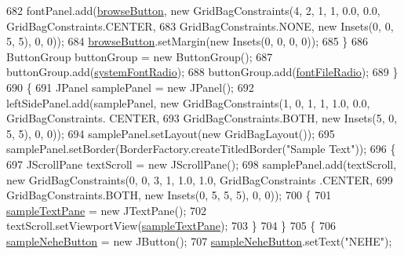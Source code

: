 \begin{DoxyCode}
682                 fontPanel.add(\mbox{\hyperlink{classorg_1_1newdawn_1_1slick_1_1tools_1_1hiero_1_1_hiero_a2a832e3532956e0f2a7fa390f9b8bc27}{browseButton}}, \textcolor{keyword}{new} GridBagConstraints(4, 2, 1, 1, 0.0, 0.0, 
      GridBagConstraints.CENTER,
683                     GridBagConstraints.NONE, \textcolor{keyword}{new} Insets(0, 0, 5, 5), 0, 0));
684                 \mbox{\hyperlink{classorg_1_1newdawn_1_1slick_1_1tools_1_1hiero_1_1_hiero_a2a832e3532956e0f2a7fa390f9b8bc27}{browseButton}}.setMargin(\textcolor{keyword}{new} Insets(0, 0, 0, 0));
685             \}
686             ButtonGroup buttonGroup = \textcolor{keyword}{new} ButtonGroup();
687             buttonGroup.add(\mbox{\hyperlink{classorg_1_1newdawn_1_1slick_1_1tools_1_1hiero_1_1_hiero_a59931ca39c1c08a384804e587259075f}{systemFontRadio}});
688             buttonGroup.add(\mbox{\hyperlink{classorg_1_1newdawn_1_1slick_1_1tools_1_1hiero_1_1_hiero_a2adc5b7c8bcbf375142240e2ab009adf}{fontFileRadio}});
689         \}
690         \{
691             JPanel samplePanel = \textcolor{keyword}{new} JPanel();
692             leftSidePanel.add(samplePanel, \textcolor{keyword}{new} GridBagConstraints(1, 0, 1, 1, 1.0, 0.0, GridBagConstraints.
      CENTER,
693                 GridBagConstraints.BOTH, \textcolor{keyword}{new} Insets(5, 0, 5, 5), 0, 0));
694             samplePanel.setLayout(\textcolor{keyword}{new} GridBagLayout());
695             samplePanel.setBorder(BorderFactory.createTitledBorder(\textcolor{stringliteral}{"Sample Text"}));
696             \{
697                 JScrollPane textScroll = \textcolor{keyword}{new} JScrollPane();
698                 samplePanel.add(textScroll, \textcolor{keyword}{new} GridBagConstraints(0, 0, 3, 1, 1.0, 1.0, GridBagConstraints
      .CENTER,
699                     GridBagConstraints.BOTH, \textcolor{keyword}{new} Insets(0, 5, 5, 5), 0, 0));
700                 \{
701                     \mbox{\hyperlink{classorg_1_1newdawn_1_1slick_1_1tools_1_1hiero_1_1_hiero_ae923b0a4ac6a5cbf8354555cb6091d26}{sampleTextPane}} = \textcolor{keyword}{new} JTextPane();
702                     textScroll.setViewportView(\mbox{\hyperlink{classorg_1_1newdawn_1_1slick_1_1tools_1_1hiero_1_1_hiero_ae923b0a4ac6a5cbf8354555cb6091d26}{sampleTextPane}});
703                 \}
704             \}
705             \{
706                 \mbox{\hyperlink{classorg_1_1newdawn_1_1slick_1_1tools_1_1hiero_1_1_hiero_a52c15e38f26347d1de7fc7ae6c87804f}{sampleNeheButton}} = \textcolor{keyword}{new} JButton();
707                 \mbox{\hyperlink{classorg_1_1newdawn_1_1slick_1_1tools_1_1hiero_1_1_hiero_a52c15e38f26347d1de7fc7ae6c87804f}{sampleNeheButton}}.setText(\textcolor{stringliteral}{"NEHE"});

\end{DoxyCode}
